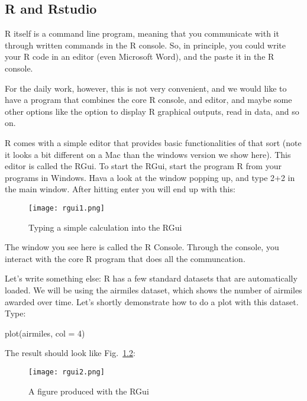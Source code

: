 \documentclass[a4paper,twoside]{tufte-book}\usepackage[]{graphicx}\usepackage[]{color}
\begin{document}
\begin{appendices}

\chapter{R and Rstudio}

R itself is a command line program, meaning that you communicate with it through written commands in the R console. So, in principle, you could write your R code in an editor (even Microsoft Word), and the paste it in the R console. 

For the daily work, however, this is not very convenient, and we would like to have a program that combines the core R console, and editor, and maybe some other options like the option to display R graphical outputs, read in data, and so on. 

R comes with a simple editor that provides basic functionalities of that sort (note it looks a bit different on a Mac than the windows version we show here). This editor is called the RGui. To start the RGui, start the program R from your programs in Windows. Hava a look at the window popping up, and type 2+2 in the main window. After hitting enter you will end up with this:

\begin{figure}[]
\begin{center}
\texttt{[image: rgui1.png]}
\caption{Typing a simple calculation into the RGui}
\label{fig: Rgui1}
\end{center}
\end{figure}


The window you see here is called the R Console. Through the console, you interact with the core R program that does all the communcation. 

Let's write something else: R has a few standard datasets that are automatically loaded. We will be using the airmiles dataset, which shows the number of airmiles awarded over time. Let's shortly demonstrate how to do a plot with this dataset. Type:

\begin{Schunk}
\begin{Sinput}
plot(airmiles, col = 4)
\end{Sinput}
\end{Schunk}

The result should look like Fig.~\ref{fig: Rgui2}:

\begin{figure}[]
\begin{center}
\texttt{[image: rgui2.png]}
\caption{A figure produced with the RGui}
\label{fig: Rgui2}
\end{center}
\end{figure}


\end{appendices}
\end{document}
